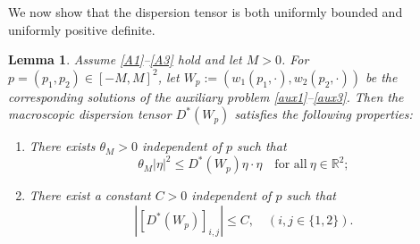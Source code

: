 \documentclass[11pt]{article}
\newtheorem{lemma}{Lemma}
\begin{document}
We now show that the dispersion tensor is both uniformly bounded and uniformly positive definite. 
\begin{lemma}\label{L2}
{Assume \ref{A1}--\ref{A3}} hold and let $M>0$.
For $p=(p_1,p_2)\in [-M,M]^2$, let $W_p:=(w_1(p_1,\cdot ),w_2(p_2,\cdot ))$ be the corresponding solutions of the auxiliary problem \eqref{aux1}--\eqref{aux3}. Then the macroscopic dispersion tensor $D^*(W_p)$ satisfies the following properties:
\begin{enumerate}[label=(\roman*)]
    \item There exists $\theta_M>0$ independent of $p$ such that 
         \begin{equation}\label{L2e1}
             \theta_M|\eta |^{2} \leq
             D^*(W_p)\eta \cdot \eta\quad \text{for all}\ \eta\in \mathbb{R}^2;
          \end{equation}

    \item There exist a constant $C>0$ independent of $p$ such that
         \begin{equation}\label{L2e2}
            | [D^*(W_p)]_{i,j}|\leq C,\quad (i,j\in\{1,2\}).
         \end{equation}
\end{enumerate}
\end{lemma}
\end{document}
